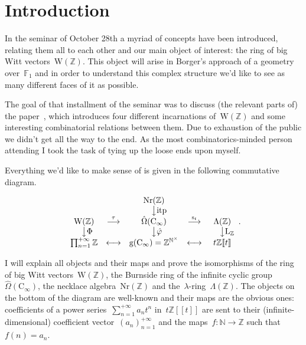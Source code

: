 \section{Introduction}
In the seminar of October 28th a myriad of concepts have been introduced, relating them all to each other and our main object of interest: the ring of big Witt vectors~$\mathrm{W}(\mathbb{Z})$. This object will arise in Borger's approach of a geometry over~$\mathbb{F}_1$ and in order to understand this complex structure we'd like to see as many different faces of it as possible.

The goal of that installment of the seminar was to discuss (the relevant parts of) the paper~\cite{the-burnside-ring}, which introduces four different incarnations of~$\mathrm{W}(\mathbb{Z})$ and some interesting combinatorial relations between them. Due to exhaustion of the public we didn't get all the way to the end. As the most combinatorics-minded person attending I took the task of tying up the loose ends upon myself.

Everything we'd like to make sense of is given in the following commutative diagram.

\begin{equation}
  \begin{array}{ccccc}
    & & \mathrm{Nr}(\mathbb{Z}) & & \\
    & & \phantom{\textrm{itp}}\big\downarrow\textrm{itp} & & \\
    \mathrm{W}(\mathbb{Z}) & \overset{\tau}{\longrightarrow} & \hat{\Omega}(\mathrm{C}_\infty) & \overset{\mathrm{s}_t}{\longrightarrow} & \Lambda(\mathbb{Z}) \\
    \phantom{\Phi}\big\downarrow\Phi & & \phantom{\hat{\varphi}}\big\downarrow\hat{\varphi} & & \phantom{\mathrm{L}_{\mathbb{Z}}}\big\downarrow\mathrm{L}_{\mathbb{Z}} \\
    \prod_{n=1}^{+\infty}\mathbb{Z} & \longleftrightarrow & \mathrm{g}(\mathrm{C}_\infty)=\mathbb{Z}^{\mathbb{N}^\times} & \longleftrightarrow & t\mathbb{Z}[\![t]\!]
  \end{array}.
\end{equation}

I will explain all objects and their maps and prove the isomorphisms of the ring of big Witt vectors~$\mathrm{W}(\mathbb{Z})$, the Burnside ring of the infinite cyclic group~$\hat{\Omega}(\mathrm{C}_\infty)$, the necklace algebra~$\mathrm{Nr}(\mathbb{Z})$ and the~$\lambda$\nobreakdash-ring~$\Lambda(\mathbb{Z})$. The objects on the bottom of the diagram are well-known and their maps are the obvious ones: coefficients of a power series~$\sum_{n=1}^{+\infty}a_nt^n$ in~$t\mathbb{Z}[\![t]\!]$ are sent to their (infinite-dimensional) coefficient vector~$(a_n)_{n=1}^{+\infty}$ and the maps~$f\colon\mathbb{N}\to\mathbb{Z}$ such that~$f(n)=a_{n}$.

